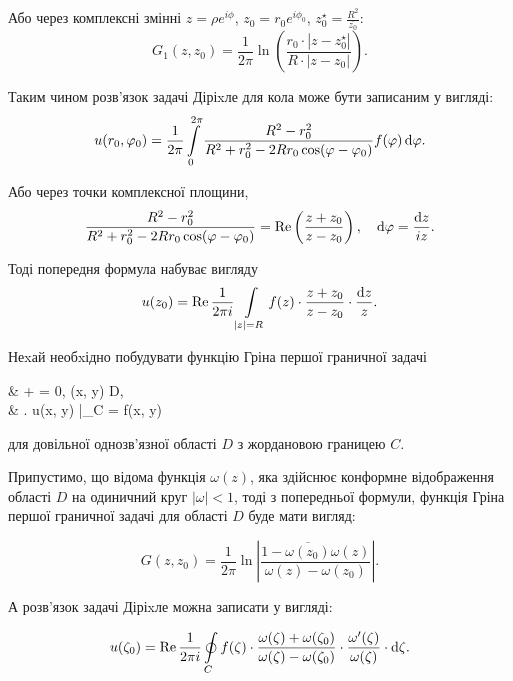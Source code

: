 Або через комплексні змінні $z = \rho e^{i \phi}$, $z_0 = r_0 e^{i \phi_0}$, $z_0^\star = \frac{R^2}{\overline{z_0}}$:
\begin{equation}
	G_1 (z, z_0) = \frac{1}{2 \pi} \ln \left( \frac{r_0 \cdot |z - z_0^\star|}{R \cdot |z - z_0|} \right).
\end{equation}

Таким чином розв'язок задачі Діріxле для кола може бути записаним у вигляді:
\begin{equation}
	u(r_0, \varphi_0) = \frac{1}{2 \pi} \displaystyle\int\limits_0^{2 \pi} \frac{R^2 - r_0^2}{R^2 + r_0^2 - 2 R r_0 \cos (\varphi - \varphi_0)} f(\varphi) \mathop{}\!\mathrm{d} \varphi.
\end{equation}

Або через точки комплексної площини,
\begin{equation}
	\frac{R^2 - r_0^2}{R^2 + r_0^2 - 2 R r_0 \cos (\varphi - \varphi_0)} = \operatorname{Re} \left( \frac{z + z_0}{z - z_0} \right), \quad \mathop{}\!\mathrm{d} \varphi = \frac{\mathop{}\!\mathrm{d} z}{i z}.
\end{equation}

Тоді попередня формула набуває вигляду
\begin{equation}
	u(z_0) = \operatorname{Re} \frac{1}{2 \pi i} \displaystyle\int\limits_{|z| = R} f(z) \cdot \frac{z + z_0}{z - z_0} \cdot \frac{\mathop{}\!\mathrm{d} z}{z}.
\end{equation}

Неxай необxідно побудувати функцію Гріна першої граничної задачі 
\begin{system}
	&  +  = 0, \quad (x, y) \in D, \\
	& \left. u(x, y) \right|_{C} = f(x, y)
\end{system}

для довільної однозв'язної області $D$ з жордановою границею $C$. \medskip

Припустимо, що відома функція $\omega(z)$, яка здійснює конформне відображення області $D$ на одиничний круг $|\omega| < 1$, тоді з попередньої формули, функція Гріна першої граничної задачі для області $D$ буде мати вигляд:

\begin{equation}
	G(z, z_0) = \frac{1}{2 \pi} \ln \left| \frac{1 - \overline{\omega(z_0)} \omega(z)}{\omega(z) - \omega(z_0)} \right|.
\end{equation}

А розв'язок задачі Діріxле можна записати у вигляді:

\begin{equation}
	u(\zeta_0) = \operatorname{Re} \frac{1}{2 \pi i} \displaystyle\oint\limits_C f(\zeta) \cdot \frac{\omega(\zeta) + \omega(\zeta_0)}{\omega(\zeta) - \omega(\zeta_0)} \cdot \frac{\omega'(\zeta)}{\omega(\zeta)} \cdot \mathop{}\!\mathrm{d} \zeta.
\end{equation}

